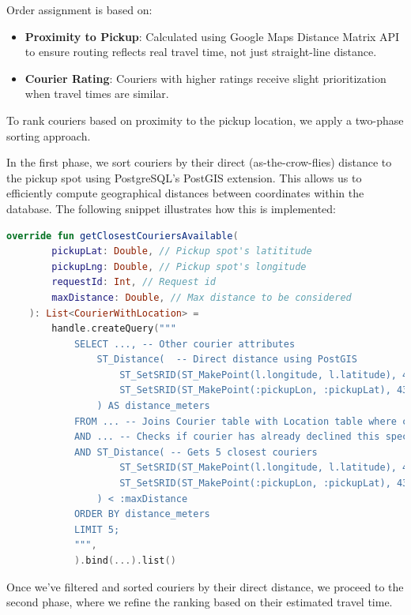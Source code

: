 Order assignment is based on:

\begin{itemize}
    \item \textbf{Proximity to Pickup}: Calculated using Google Maps Distance Matrix API to ensure routing reflects real travel time, not just straight-line distance.
    \item \textbf{Courier Rating}: Couriers with higher ratings receive slight prioritization when travel times are similar.
\end{itemize}

To rank couriers based on proximity to the pickup location, we apply a two-phase sorting approach.

In the first phase, we sort couriers by their direct (as-the-crow-flies) distance to the pickup spot using PostgreSQL's PostGIS extension. This allows us to efficiently compute geographical distances between coordinates within the database. The following snippet illustrates how this is implemented:

\begin{lstlisting}[language=Kotlin, caption={Ranking couriers by direct distance using PostgreSQL PostGIS extension}]
override fun getClosestCouriersAvailable(
        pickupLat: Double, // Pickup spot's latititude
        pickupLng: Double, // Pickup spot's longitude
        requestId: Int, // Request id
        maxDistance: Double, // Max distance to be considered
    ): List<CourierWithLocation> =
        handle.createQuery("""
            SELECT ..., -- Other courier attributes
                ST_Distance(  -- Direct distance using PostGIS
                    ST_SetSRID(ST_MakePoint(l.longitude, l.latitude), 4326)::geography,
                    ST_SetSRID(ST_MakePoint(:pickupLon, :pickupLat), 4326)::geography
                ) AS distance_meters
            FROM ... -- Joins Courier table with Location table where courier is available
            AND ... -- Checks if courier has already declined this specific request
            AND ST_Distance( -- Gets 5 closest couriers
                    ST_SetSRID(ST_MakePoint(l.longitude, l.latitude), 4326)::geography,
                    ST_SetSRID(ST_MakePoint(:pickupLon, :pickupLat), 4326)::geography
                ) < :maxDistance
            ORDER BY distance_meters
            LIMIT 5;
            """,
            ).bind(...).list()
\end{lstlisting}

\noindent Once we've filtered and sorted couriers by their direct distance, we proceed to the second phase, where we refine the ranking based on their estimated travel time.


